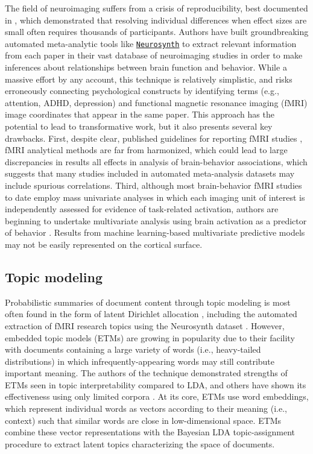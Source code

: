 The field of neuroimaging suffers from a crisis of reproducibility, best documented in \cite{MarekEtAl2022}, which demonstrated that resolving individual differences when effect sizes are small often requires thousands of participants. Authors have built groundbreaking automated meta-analytic tools like \href{https://neurosynth.org/}{\texttt{Neurosynth}} \cite{YarkoniEtAl2011} to extract relevant information from each paper in their vast database of neuroimaging studies in order to make inferences about relationships between brain function and behavior. While a massive effort by any account, this technique is relatively simplistic, and risks erroneously connecting psychological constructs by identifying terms (e.g., attention, ADHD, depression) and functional magnetic resonance imaging (fMRI) image coordinates that appear in the same paper. This approach has the potential to lead to transformative work, but it also presents several key drawbacks. First, despite clear, published guidelines for reporting fMRI studies \cite{PoldrackEtAl2008}, fMRI analytical methods are far from harmonized, which could lead to large discrepancies in results \cite{Botvinik-NezerEtAl2020} all effects in analysis of brain-behavior associations, which suggests that many studies included in automated meta-analysis datasets may include spurious correlations. Third, although most brain-behavior fMRI studies to date employ mass univariate analyses in which each imaging unit of interest is independently assessed for evidence of task-related activation, authors are beginning to undertake multivariate analysis using brain activation as a predictor of behavior \cite[e.g.,][]{YuanEtAl2023}. Results from machine learning-based multivariate predictive models may not be easily represented on the cortical surface. 	

\subsection{Topic modeling}

Probabilistic summaries of document content through topic modeling is most often found in the form of latent Dirichlet allocation \cite[LDA;][]{Blei2003}, including the automated extraction of fMRI research topics using the Neurosynth dataset \cite{PoldrackEtAl2012, RubinEtAl2017}. However, embedded topic models (ETMs) are growing in popularity due to their facility with documents containing a large variety of words (i.e., heavy-tailed distributions) in which infrequently-appearing words may still contribute important meaning. The authors of the technique demonstrated strengths of ETMs seen in topic interpretability compared to LDA, and others have shown its effectiveness using only limited corpora \cite{GulEtAl2023}. At its core, ETMs use word embeddings, which represent individual words as vectors according to their meaning (i.e., context) such that similar words are close in low-dimensional space. ETMs combine these vector representations with the Bayesian LDA topic-assignment procedure to extract latent topics characterizing the space of documents.

